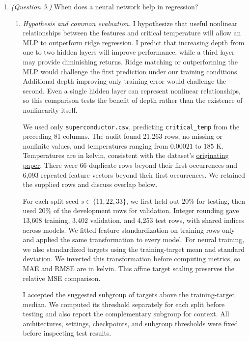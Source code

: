 \documentclass[12pt]{article}
\begin{document}
\begin{enumerate}
   \item \emph{(Question 5.)} When does a neural network help in regression?
   \begin{enumerate}[label=\textbf{\Alph*.}, leftmargin=*]
       \setlength{\emergencystretch}{2em}
       \setlength{\tabcolsep}{4pt}
       \item \emph{Hypothesis and common evaluation.}
       I hypothesize that useful nonlinear relationships between the
       features and critical temperature will allow an MLP to outperform
       ridge regression. I predict that increasing depth from one to two
       hidden layers will improve performance, while a third layer may
       provide diminishing returns. Ridge matching or outperforming the
       MLP would challenge the first prediction under our training
       conditions. Additional depth improving only training error would
       challenge the second. Even a single hidden layer can represent
       nonlinear relationships, so this comparison tests the benefit of
       depth rather than the existence of nonlinearity itself.

       We used only \texttt{superconductor.csv}, predicting
       \texttt{critical\_temp} from the preceding 81 columns. The audit
       found 21,263 rows, no missing or nonfinite values, and temperatures
       ranging from $0.00021$ to $185$ K. Temperatures are in kelvin,
       consistent with the dataset's
       \href{https://arxiv.org/html/1803.10260}{originating paper}.
       There were 66 duplicate rows beyond their first occurrences and
       6,093 repeated feature vectors beyond their first occurrences.
       We retained the supplied rows and discuss overlap below.

       For each split seed $s\in\{11,22,33\}$, we first held out $20\%$
       for testing, then used $20\%$ of the development rows for
       validation. Integer rounding gave 13,608 training, 3,402 validation,
       and 4,253 test rows, with shared indices across models.
       We fitted feature standardization on training rows only and
       applied the same transformation to every model. For neural
       training, we also standardized targets using the training-target
       mean and standard deviation. We inverted this transformation
       before computing metrics, so MAE and RMSE are in kelvin.
       This affine target scaling preserves the relative MSE comparison.

       I accepted the suggested subgroup of targets above the
       training-target median. We computed its threshold separately
       for each split before testing and also report the complementary
       subgroup for context. All architectures, settings, checkpoints,
       and subgroup thresholds were fixed before inspecting test results.


\end{enumerate}
\end{enumerate}
\end{document}
